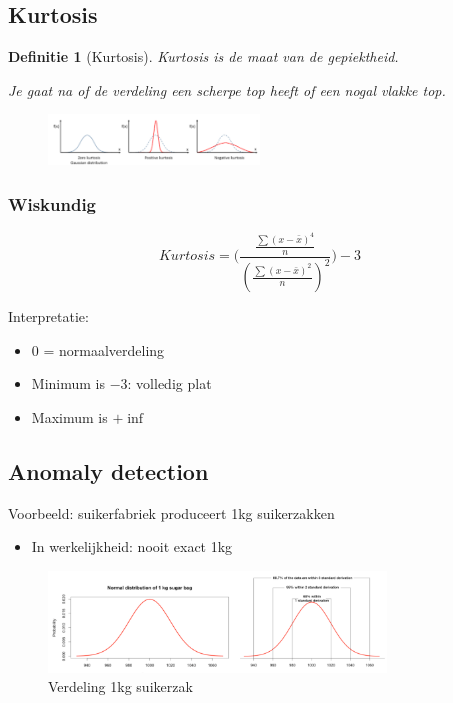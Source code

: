 \documentclass{article}
\newtheorem{theorem}{Definitie}[section]
\begin{document}
\subsection{Kurtosis}

\begin{theorem}[Kurtosis]
    Kurtosis is de maat van de gepiektheid. 

    Je gaat na of de verdeling een scherpe top heeft of een nogal vlakke top.
\end{theorem}

\begin{figure}[H]
    \centering
    \includegraphics[width=0.5\textwidth]{kurtosis.png}
\end{figure}

\subsubsection{Wiskundig}

\begin{equation}
    Kurtosis = \Bigg(\frac{\frac{\sum(x-\bar{x})^4}{n}}{(\frac{\sum(x-\bar{x})^2}{n})^2} \Bigg) -3
\end{equation}

Interpretatie:

\begin{itemize}
    \item $0$ = normaalverdeling
    \item Minimum is $-3$: volledig plat
    \item Maximum is $+\inf$
\end{itemize}


\subsection{Anomaly detection}

Voorbeeld: suikerfabriek produceert 1kg suikerzakken

\begin{itemize}
    \item In werkelijkheid: nooit exact 1kg
\end{itemize}

\begin{figure}[H]
    \centering
    \includegraphics[width=0.8\textwidth]{anomaly-detection.png}
    \caption{Verdeling 1kg suikerzak}
\end{figure}
\end{document}
